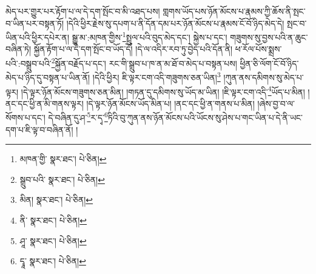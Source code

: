 མེད་པར་གྱུར་པར་རྟོག་པ་ལ་དེ་དག་སྤོང་བ་མི་འཐད་པས། གླགས་ཡོད་པས་ཉོན་མོངས་པ་རྣམས་ཀྱི་ཆོས་ནི་སྤང་བ་ཡིན་པར་བསྟན་ཏོ། །དེའི་ཕྱིར་རྗེས་སུ་དཔག་པ་ནི་དོན་དམ་པར་ཉོན་མོངས་པ་རྣམས་ངོ་བོ་ཉིད་མེད་དེ། སྤང་བ་ཡིན་པའི་ཕྱིར་དཔེར་ན། སྒྱུ་མ་:མཁན་གྱིས་\footnote{མཁན་གྱི་  སྣར་ཐང་།  པེ་ཅིན། }སྤྲུལ་པའི་བུད་མེད་དང་། སྐྱེས་པ་དང་། གཟུགས་སུ་བྱས་པའི་ན་ཆུང་བཞིན་ཏེ། སྐྱོན་རྟོག་པ་ལ་དེ་དག་སྤོང་བ་ཡོད་དོ། །དེ་ལ་འདིར་རབ་ཏུ་བྱེད་པའི་དོན་ནི། ཕ་རོལ་པོས་སྨྲས་པའི་:བསྒྲུབ་པའི་\footnote{སྒྲུབ་པའི་  སྣར་ཐང་།  པེ་ཅིན། }སྐྱོན་བརྗོད་པ་དང་། རང་གི་སྒྲུབ་པ་ཁ་ན་མ་ཐོ་བ་མེད་པ་བསྟན་པས། ཕྱིན་ཅི་ལོག་ངོ་བོ་ཉིད་མེད་པ་ཉིད་དུ་བསྟན་པ་ཡིན་ནོ། །དེའི་ཕྱིར། ཇི་ལྟར་ངག་འདི་གཟུགས་ཅན་ཡིན།\footnote{མིན།  སྣར་ཐང་།  པེ་ཅིན། } །ཀུན་ནས་དམིགས་སུ་མེད་པ་ལྟར། །དེ་ལྟར་ཉོན་མོངས་གཟུགས་ཅན་མིན། །གཏན་དུ་དམིགས་སུ་ཡོད་མ་ཡིན། །ཇི་ལྟར་ངག་འདི་\footnote{ནི་  སྣར་ཐང་།  པེ་ཅིན། }ཡོད་པ་མིན། །ནང་དང་ཕྱི་ན་མི་གནས་ལྟར། །དེ་ལྟར་ཉོན་མོངས་ཡོད་མིན་པ། །ནང་དང་ཕྱི་ན་གནས་པ་མིན། །ཞེས་བྱ་བ་ལ་སོགས་པ་དང་། དེ་བཞིན་དུ་ཤ་\footnote{ཤཱ་  སྣར་ཐང་།  པེ་ཅིན། }ར་དྭ་\footnote{དྭཱ་  སྣར་ཐང་།  པེ་ཅིན། }ཏིའི་བུ་ཀུན་ནས་ཉོན་མོངས་པའི་ཡོངས་སུ་ཤེས་པ་གང་ཡིན་པ་དེ་ནི་ཡང་དག་པ་ཇི་ལྟ་བ་བཞིན་ནོ། །
